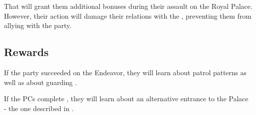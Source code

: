 That will grant them additional bonuses during their assault on the Royal Palace. However, their action will damage their relations with the \npcFractionCult{}, preventing them from allying with the party.



\subsection{Rewards}

If the party succeeded on the Endeavor, they will learn about \enemyQueensGuard{} patrol patterns as well as about \enemyQueensShardbearer{} guarding .

If the PCs complete , they will learn about an alternative entrance to the Palace - the one described in .